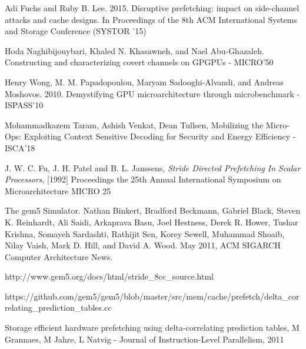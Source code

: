 \documentclass[10pt,usenames,dvipsnames]{beamer}
\begin{document}
\begin{frame}[allowframebreaks]
\begin{thebibliography}{10}
Adi Fuchs and Ruby B. Lee. 2015. Disruptive prefetching: impact on side-channel attacks and cache designs. In Proceedings of the 8th ACM International Systems and Storage Conference (SYSTOR '15)

Hoda Naghibijouybari, Khaled N. Khasawneh, and Nael Abu-Ghazaleh. Constructing and characterizing covert channels on GPGPUs - MICRO'50

Henry Wong, M. M. Papadopoulou, Maryam Sadooghi-Alvandi, and Andreas Moshovos. 2010. Demystifying GPU microarchitecture through microbenchmark - ISPASS'10

Mohammadkazem Taram, Ashish Venkat, Dean Tullsen, Mobilizing the Micro-Ops: Exploiting Context Sensitive Decoding for Security and Energy Efficiency - ISCA'18

J. W. C. Fu, J. H. Patel and B. L. Janssens, {\it Stride Directed Prefetching In Scalar Processors}, [1992] Proceedings the 25th Annual International Symposium on Microarchitecture MICRO 25

The gem5 Simulator. Nathan Binkert, Bradford Beckmann, Gabriel Black, Steven K. Reinhardt, Ali Saidi, Arkaprava Basu, Joel Hestness, Derek R. Hower, Tushar Krishna, Somayeh Sardashti, Rathijit Sen, Korey Sewell, Muhammad Shoaib, Nilay Vaish, Mark D. Hill, and David A. Wood. May 2011, ACM SIGARCH Computer Architecture News.

http://www.gem5.org/docs/html/stride\_8cc\_source.html

https://github.com/gem5/gem5/blob/master/src/mem/cache/prefetch/delta\_correlating\_prediction\_tables.cc

Storage efficient hardware prefetching using delta-correlating prediction tables, M Grannaes, M Jahre, L Natvig - Journal of Instruction-Level Parallelism, 2011
\end{thebibliography}
\end{frame}

\end{document}
